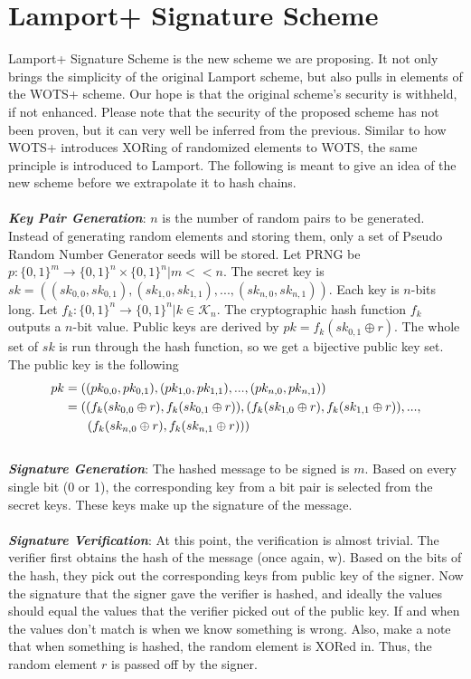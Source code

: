 \documentclass[]{scrartcl}
\makeatletter
\newcommand{\mathleft}{\@fleqntrue\@mathmargin0pt}
\makeatother
\begin{document}
\section*{Lamport+ Signature Scheme}
Lamport+ Signature Scheme is the new scheme we are proposing. It not only brings the simplicity of the original Lamport scheme, but also pulls in elements of the WOTS+ scheme. Our hope is that the original scheme's security is withheld, if not enhanced. Please note that the security of the proposed scheme has not been proven, but it can very well be inferred from the previous. Similar to how WOTS+ introduces XORing of randomized elements to WOTS, the same principle is introduced to Lamport. The following is meant to give an idea of the new scheme before we extrapolate it to hash chains.\\ \\
\textbf{\textit{Key Pair Generation}}: $n$ is the number of random pairs to be generated. Instead of generating random elements and storing them, only a set of Pseudo Random Number Generator seeds will be stored. Let PRNG be $p : \{0,1\}^m \rightarrow \{0,1\}^n \times \{0,1\}^n | m << n$. The secret key is $sk = ((sk_{0,0}, sk_{0,1}),(sk_{1,0}, sk_{1,1}),...,(sk_{n,0}, sk_{n,1}))$. Each key is $n$-bits long. Let $f_k : \{0,1\}^n \rightarrow \{0,1\}^n | k \in \mathcal{K}_n$. The cryptographic hash function $f_k$ outputs a $n$-bit value. Public keys are derived by $pk = f_k(sk_{0,1} \oplus r)$. The whole set of $sk$ is run through the hash function, so we get a bijective public key set. The public key is the following 
\mathleft
\begin{equation}
\begin{split}
pk & = ((pk_{0,0}, pk_{0,1}),(pk_{1,0}, pk_{1,1}),...,(pk_{n,0}, pk_{n,1})) \\
& = ((f_k(sk_{0,0} \oplus r), f_k(sk_{0,1}\oplus r)),(f_k(sk_{1,0} \oplus r), f_k(sk_{1,1}\oplus r)),...,\\
& \hspace{0.65cm}(f_k(sk_{n,0} \oplus r), f_k(sk_{n,1}\oplus r)))
\end{split}
\end{equation} \\
\textbf{\textit{Signature Generation}}: The hashed message to be signed is $m$. Based on every single bit (0 or 1), the corresponding key from a bit pair is selected from the secret keys. These keys make up the signature of the message.\\ \\
\textbf{\textit{Signature Verification}}: At this point, the verification is almost trivial. The verifier first obtains the hash of the message (once again, w). Based on the bits of the hash, they pick out the corresponding keys from public key of the signer. Now the signature that the signer gave the verifier is hashed, and ideally the values should equal the values that the verifier picked out of the public key. If and when the values don't match is when we know something is wrong. Also, make a note that when something is hashed, the random element is XORed in. Thus, the random element $r$ is passed off by the signer.
\end{document}
